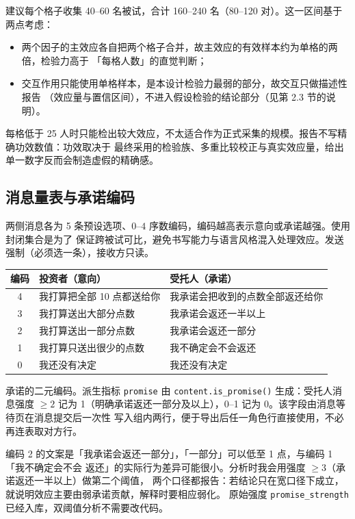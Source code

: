 \documentclass[10pt,a4paper]{ctexart}
\newcommand{\code}[1]{\texttt{#1}}
\begin{document}
建议每个格子收集 40--60 名被试，合计 160--240 名（80--120 对）。这一区间基于两点考虑：

\begin{itemize}
  \item 两个因子的主效应各自把两个格子合并，故主效应的有效样本约为单格的两倍，检验力高于
        「每格人数」的直觉判断；
  \item 交互作用只能使用单格样本，是本设计检验力最弱的部分，故交互只做描述性报告
        （效应量与置信区间），不进入假设检验的结论部分（见第 2.3 节的说明）。
\end{itemize}

每格低于 25 人时只能检出较大效应，不太适合作为正式采集的规模。报告不写精确功效数值：功效取决于
最终采用的检验族、多重比较校正与真实效应量，给出单一数字反而会制造虚假的精确感。

\subsection{消息量表与承诺编码}

两侧消息各为 5 条预设选项、$0$--$4$ 序数编码，编码越高表示意向或承诺越强。使用封闭集合是为了
保证跨被试可比，避免书写能力与语言风格混入处理效应。发送强制（必须选一条），接收方只读。

\begin{table}[h]
\centering\small
\begin{tabular}{cll}
\toprule
编码 & 投资者（意向） & 受托人（承诺） \\
\midrule
4 & 我打算把全部 10 点都送给你 & 我承诺会把收到的点数全部返还给你 \\
3 & 我打算送出大部分点数 & 我承诺会返还一半以上 \\
2 & 我打算送出一部分点数 & 我承诺会返还一部分 \\
1 & 我打算只送出很少的点数 & 我不确定会不会返还 \\
0 & 我还没有决定 & 我还没有决定 \\
\bottomrule
\end{tabular}
\end{table}

承诺的二元编码。派生指标 \code{promise} 由 \code{content.is\_promise()} 生成：受托人消息强度
$\geq 2$ 记为 1（明确承诺返还一部分及以上），0--1 记为 0。该字段由消息等待页在消息提交后一次性
写入组内两行，便于导出后任一角色行直接使用，不必再连表取对方行。

编码 2 的文案是「我承诺会返还一部分」，「一部分」可以低至 1 点，与编码 1「我不确定会不会
返还」的实际行为差异可能很小。分析时我会用强度 $\geq 3$（承诺返还一半以上）做第二个阈值，
两个口径都报告：若结论只在宽口径下成立，就说明效应主要由弱承诺贡献，解释时要相应弱化。
原始强度 \code{promise\_strength} 已经入库，双阈值分析不需要改代码。
\end{document}
